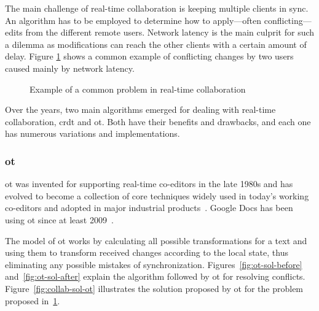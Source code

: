 The main challenge of real-time collaboration is keeping multiple clients in sync.
An algorithm has to be employed to determine how to apply---often conflicting---edits from the different remote users.
Network latency is the main culprit for such a dilemma as modifications can reach the other clients with a certain amount of delay.
Figure \ref{fig:collab-problem} shows a common example of conflicting changes by two users caused mainly by network latency.

\begin{figure}[H]
  \centerfloat
  \sffamily

  \caption{Example of a common problem in real-time collaboration}
  \label{fig:collab-problem}
\end{figure}

Over the years, two main algorithms emerged for dealing with real-time collaboration, \acrfull{crdt} and \acrfull{ot}.
Both have their benefits and drawbacks, and each one has numerous variations and implementations.

\subsubsection{\acrfull{ot}}

\acrlong{ot} was invented for supporting real-time co-editors in the late 1980s and has evolved to become a collection of core techniques widely used in today's working co-editors and adopted in major industrial products~\autocite{sun_real_2020}.
Google Docs has been using \acrshort{ot} since at least 2009~\autocite{noauthor_whats_nodate}.

The model of \acrlong{ot} works by calculating all possible transformations for a text and using them to transform received changes according to the local state, thus eliminating any possible mistakes of synchronization.
Figures~\ref{fig:ot-sol-before} and~\ref{fig:ot-sol-after} explain the algorithm followed by \acrshort{ot} for resolving conflicts.
Figure~\ref{fig:collab-sol-ot} illustrates the solution proposed by \acrshort{ot} for the problem proposed in~\ref{fig:collab-problem}.



